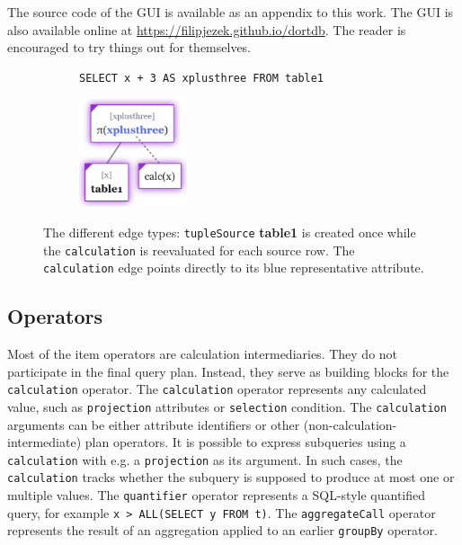 The source code of the GUI is available as an appendix to this work. The GUI is also available online at \url{https://filipjezek.github.io/dortdb}. The reader is encouraged to try things out for themselves.

\begin{figure}[htpb]
    \begin{subfigure}[b]{\textwidth}
    \begin{tcolorbox}[colback=white, colframe=black, boxrule=1pt, arc=0pt]
        \begin{verbatim}
SELECT x + 3 AS xplusthree FROM table1
        \end{verbatim}
    \end{tcolorbox}
    \end{subfigure}
    
    \medskip
    
    \begin{subfigure}[b]{\textwidth}
        \centering
        \includegraphics[width=90pt]{img/tree-edge-types.png}
    \end{subfigure}
    
    \caption{The different edge types: \texttt{tupleSource} \textbf{table1} is created once while the \texttt{calculation} is reevaluated for each source row. The \texttt{calculation} edge points directly to its blue representative attribute.}
\end{figure}

\subsection{Operators}

Most of the item operators are calculation intermediaries. They do not participate in the final query plan. Instead, they serve as building blocks for the \texttt{calculation} operator. The \texttt{calculation} operator represents any calculated value, such as \texttt{projection} attributes or \texttt{selection} condition. The \texttt{calculation} arguments can be either attribute identifiers or other (non-calculation-intermediate) plan operators. It is possible to express subqueries using a \texttt{calculation} with e.g. a \texttt{projection} as its argument. In such cases, the \texttt{calculation} tracks whether the subquery is supposed to produce at most one or multiple values. The \texttt{quantifier} operator represents a SQL-style quantified query, for example \texttt{x > ALL(SELECT y FROM t)}. The \texttt{aggregateCall} operator represents the result of an aggregation applied to an earlier \texttt{groupBy} operator.

